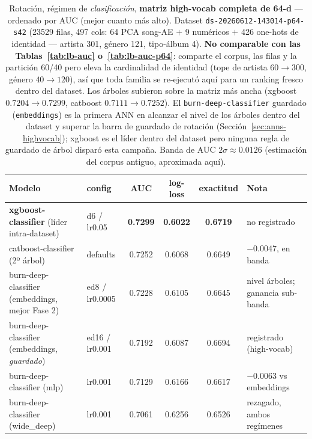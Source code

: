 \documentclass[11pt]{article}
\newcommand{\dsid}[1]{\texttt{\small #1}}
\newcommand{\best}[1]{\textbf{#1}}
\begin{document}
\begin{table}[ht]
  \centering
  \caption{Rotación, régimen de \emph{clasificación}, \textbf{matriz high-vocab
  completa de 64-d} --- ordenado por AUC (mejor cuanto más alto). Dataset
  \dsid{ds-20260612-143014-p64-s42} (\num{23529} filas, 497 cols: 64 PCA song-AE
  $+$ 9 numéricos $+$ 426 one-hots de identidad --- artista 301, género 121,
  tipo-álbum 4). \textbf{No comparable con las Tablas~\ref{tab:lb-auc}
  o~\ref{tab:lb-auc-p64}}: comparte el corpus, las filas y la partición 60/40
  pero eleva la cardinalidad de identidad (tope de artista $60\to300$, género
  $40\to120$), así que toda familia se re-ejecutó aquí para un ranking fresco
  dentro del dataset. Los árboles subieron sobre la matriz más ancha (xgboost
  $0.7204\to\num{0.7299}$, catboost $0.7111\to\num{0.7252}$). El
  \texttt{burn-deep-classifier} guardado (\texttt{embeddings}) es la primera ANN
  en alcanzar el nivel de los árboles dentro del dataset y superar la barra de
  guardado de rotación (Sección~\ref{sec:anns-highvocab}); xgboost es el líder
  dentro del dataset pero ninguna regla de guardado de árbol disparó esta
  campaña. Banda de AUC $2\sigma\approx 0.0126$ (estimación del corpus antiguo,
  aproximada aquí).}
  \label{tab:lb-auc-highvocab}
  \begin{tabular}{llcccl}
    \toprule
    Modelo & config & AUC & log-loss & exactitud & Nota \\
    \midrule
    \best{xgboost-classifier} (líder intra-dataset)   & d6 / lr0.05      & \best{0.7299} & \best{0.6022} & \best{0.6719} & no registrado \\
    catboost-classifier (2º árbol)                    & defaults         & 0.7252 & 0.6068 & 0.6649 & $-0.0047$, en banda \\
    burn-deep-classifier (embeddings, mejor Fase 2)   & ed8 / lr0.0005   & 0.7228 & 0.6105 & 0.6645 & nivel árboles; ganancia sub-banda \\
    burn-deep-classifier (embeddings, \emph{guardado}) & ed16 / lr0.001   & 0.7192 & 0.6087 & 0.6694 & registrado (high-vocab) \\
    burn-deep-classifier (mlp)                        & lr0.001          & 0.7129 & 0.6166 & 0.6617 & $-0.0063$ vs embeddings \\
    burn-deep-classifier (wide\_deep)                 & lr0.001          & 0.7061 & 0.6256 & 0.6526 & rezagado, ambos regímenes \\
    \bottomrule
  \end{tabular}
\end{table}
\end{document}
